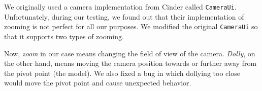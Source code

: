 We originally used a camera implementation from Cinder called \texttt{CameraUi}.
Unfortunately, during our testing, we found out that their implementation of zooming is not perfect for all our purposes.
We modified the original \texttt{CameraUi} so that it supports two types of zooming.

Now, \emph{zoom} in our case means changing the field of view of the camera.
\emph{Dolly}, on the other hand, means moving the camera position towards or further away from the pivot point (the model).
We also fixed a bug in which dollying too close would move the pivot point and cause unexpected behavior.